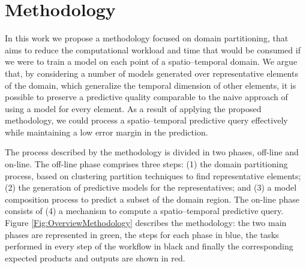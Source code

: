 \chapter[Methodology]{Methodology}
\label{Chapter:Methodology}
%
%

In this work we propose a methodology focused on domain partitioning, that aims to reduce the computational workload and time that would be consumed if we were to train a model on each point of a spatio--temporal domain. We argue that, by considering a number of models generated over representative elements of the domain, which generalize the temporal dimension of other elements, it is possible to preserve a predictive quality comparable to the naive approach of using a model for every element. As a result of applying the proposed methodology, we could process a spatio--temporal predictive query effectively while maintaining a low error margin in the prediction.


The process described by the methodology is divided in two phases, off-line and on-line. The off-line phase comprises three steps: (1) the domain partitioning process, based on clustering partition techniques to find representative elements; (2) the generation of predictive models for the representatives; and (3) a model composition process to predict a subset of the domain region.
The on-line phase consists of (4) a mechanism to compute a spatio--temporal predictive query. Figure \ref{Fig:OverviewMethodology} describes the methodology: the two main phases are represented in green, the steps for each phase in blue, the tasks performed in every step of the workflow in black and finally the corresponding expected products and outputs are shown in red. 

